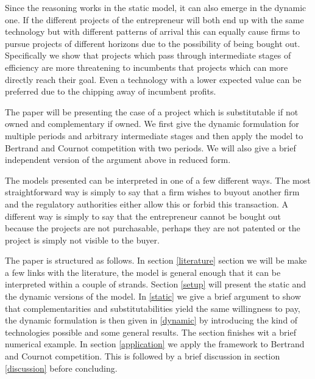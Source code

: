 Since the reasoning works in the static model, it can also emerge in the dynamic one. If the different projects of the entrepreneur will both end up with the same technology but with different patterns of arrival this can equally cause firms to pursue projects of different horizons due to the possibility of being bought out. Specifically we show that projects which pass through intermediate stages of efficiency are more threatening to incumbents that projects which can more directly reach their goal. Even a technology with a lower expected value can be preferred due to the chipping away of incumbent profits. 

The paper will be presenting the case of a project which is substitutable if not owned and complementary if owned. We first give the dynamic formulation for multiple periods and arbitrary intermediate stages and then apply the model to Bertrand and Cournot competition with two periods. We will also give a brief independent version of the argument above in reduced form. 

The models presented can be interpreted in one of a few different ways. The most straightforward way is simply to say that a firm wishes to buyout another firm and the regulatory authorities either allow this or forbid this transaction. A different way is simply to say that the entrepreneur cannot be bought out because the projects are not purchasable, perhaps they are not patented or the project is simply not visible to the buyer. 







The paper is structured as follows. 
In section \ref{literature} section we will be make a few links with the literature, the model is general enough that it can be interpreted within a couple of strands. Section \ref{setup} will present the static and the dynamic versions of the model. In \ref{static} we give a brief argument to show that complementarities and substitutabilities yield the same willingness to pay, the dynamic formulation is then given in \ref{dynamic} by introducing the kind of technologies possible and some general results. The section finishes wit a brief numerical example. In section \ref{application} we apply the framework to Bertrand and Cournot competition. This is followed by a brief discussion in section \ref{discussion} before concluding. 


